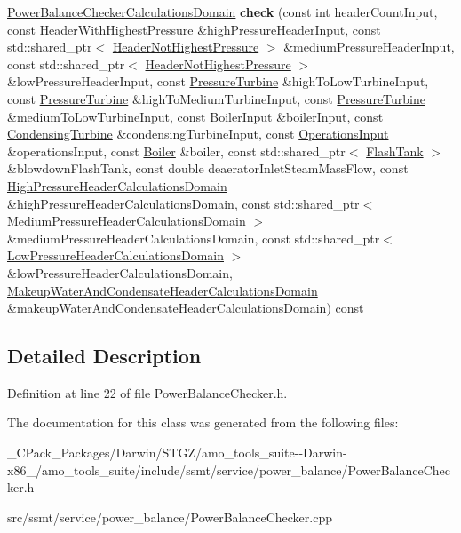 \begin{DoxyCompactItemize}
\hyperlink{class_power_balance_checker_calculations_domain}{Power\+Balance\+Checker\+Calculations\+Domain} {\bfseries check} (const int header\+Count\+Input, const \hyperlink{class_header_with_highest_pressure}{Header\+With\+Highest\+Pressure} \&high\+Pressure\+Header\+Input, const std\+::shared\+\_\+ptr$<$ \hyperlink{class_header_not_highest_pressure}{Header\+Not\+Highest\+Pressure} $>$ \&medium\+Pressure\+Header\+Input, const std\+::shared\+\_\+ptr$<$ \hyperlink{class_header_not_highest_pressure}{Header\+Not\+Highest\+Pressure} $>$ \&low\+Pressure\+Header\+Input, const \hyperlink{class_pressure_turbine}{Pressure\+Turbine} \&high\+To\+Low\+Turbine\+Input, const \hyperlink{class_pressure_turbine}{Pressure\+Turbine} \&high\+To\+Medium\+Turbine\+Input, const \hyperlink{class_pressure_turbine}{Pressure\+Turbine} \&medium\+To\+Low\+Turbine\+Input, const \hyperlink{class_boiler_input}{Boiler\+Input} \&boiler\+Input, const \hyperlink{class_condensing_turbine}{Condensing\+Turbine} \&condensing\+Turbine\+Input, const \hyperlink{class_operations_input}{Operations\+Input} \&operations\+Input, const \hyperlink{class_boiler}{Boiler} \&boiler, const std\+::shared\+\_\+ptr$<$ \hyperlink{class_flash_tank}{Flash\+Tank} $>$ \&blowdown\+Flash\+Tank, const double deaerator\+Inlet\+Steam\+Mass\+Flow, const \hyperlink{class_high_pressure_header_calculations_domain}{High\+Pressure\+Header\+Calculations\+Domain} \&high\+Pressure\+Header\+Calculations\+Domain, const std\+::shared\+\_\+ptr$<$ \hyperlink{class_medium_pressure_header_calculations_domain}{Medium\+Pressure\+Header\+Calculations\+Domain} $>$ \&medium\+Pressure\+Header\+Calculations\+Domain, const std\+::shared\+\_\+ptr$<$ \hyperlink{class_low_pressure_header_calculations_domain}{Low\+Pressure\+Header\+Calculations\+Domain} $>$ \&low\+Pressure\+Header\+Calculations\+Domain, \hyperlink{class_makeup_water_and_condensate_header_calculations_domain}{Makeup\+Water\+And\+Condensate\+Header\+Calculations\+Domain} \&makeup\+Water\+And\+Condensate\+Header\+Calculations\+Domain) const
\end{DoxyCompactItemize}


\subsection{Detailed Description}


Definition at line 22 of file Power\+Balance\+Checker.\+h.



The documentation for this class was generated from the following files\+:\begin{DoxyCompactItemize}
\item 
\+\_\+\+C\+Pack\+\_\+\+Packages/\+Darwin/\+S\+T\+G\+Z/amo\+\_\+tools\+\_\+suite-\/-\/\+Darwin-\/x86\+\_/amo\+\_\+tools\+\_\+suite/include/ssmt/service/power\+\_\+balance/Power\+Balance\+Checker.\+h\item 
src/ssmt/service/power\+\_\+balance/Power\+Balance\+Checker.\+cpp\end{DoxyCompactItemize}
